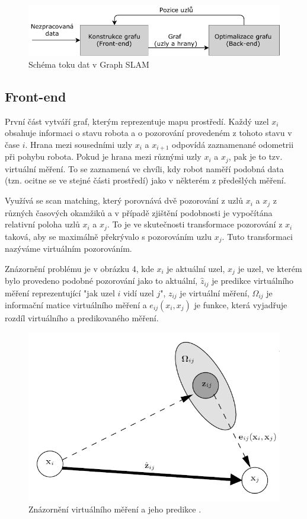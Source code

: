 \documentclass[12pt,a4paper]{report}
\begin{document}
\begin{figure}[H]
\centering
\includegraphics[scale=1.2]{img/Obr3.pdf}
\caption{Schéma toku dat v Graph SLAM}
\end{figure}

\subsection{Front-end}
První část vytváří graf, kterým reprezentuje mapu prostředí. Každý uzel $x_i$ obsahuje informaci o stavu robota a o pozorování provedeném z tohoto stavu v čase $i$. Hrana mezi sousedními uzly $x_i$ a $x_{i+1}$ odpovídá zaznamenané odometrii při pohybu robota. Pokud je hrana mezi různými uzly $x_i$ a $x_j$, pak je to tzv. virtuální měření. To se zaznamená ve chvíli, kdy robot naměří podobná data (tzn. ocitne se ve stejné části prostředí) jako v některém z předešlých měření. 

Využívá se scan matching, který porovnává dvě pozorování z uzlů $x_i$ a $x_j$ z různých časových okamžiků a v případě zjištění podobnosti je vypočítána relativní poloha uzlů $x_i$ a $x_j$. To je ve skutečnosti transformace pozorování z $x_i$ taková, aby se maximálně překrývalo s pozorováním uzlu $x_j$. Tuto transformaci nazýváme virtuálním pozorováním.

Znázornění problému je v obrázku 4, kde $x_i$ je aktuální uzel, $x_j$ je uzel, ve kterém bylo provedeno podobné pozorování jako to aktuální, $\hat{z}_{ij}$ je predikce virtuálního měření reprezentující "jak uzel $i$ vidí uzel $j$", $z_{ij}$ je virtuální měření, $\Omega_{ij}$ je informační matice virtuálního měření a $e_{ij}(x_i, x_j)$ je funkce, která vyjadřuje rozdíl virtuálního a predikovaného měření.
\begin{figure}[H]
\centering
\includegraphics[scale=0.8]{img/Obr4_b}
\caption{Znázornění virtuálního měření a jeho predikce \cite{tutorialGraph}.}
\end{figure}
\end{document}
